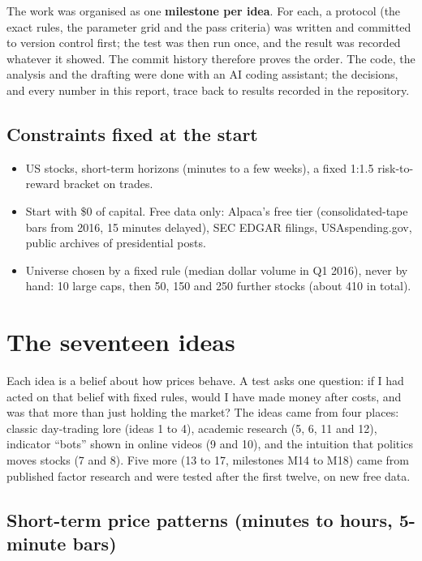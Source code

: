 \documentclass[11pt,a4paper]{article}
\providecommand{\tightlist}{\setlength{\itemsep}{0pt}\setlength{\parskip}{0pt}}
\begin{document}
The work was organised as one \textbf{milestone per idea}. For each, a protocol (the exact rules, the parameter grid and the pass
criteria) was written and committed to version control first; the test was then run once, and the result was recorded
whatever it showed. The commit history therefore proves the order. The code, the analysis and the drafting were done with an
AI coding assistant; the decisions, and every number in this report, trace back to results recorded in the repository.

\subsection{Constraints fixed at the start}\label{sec:constraints}

\begin{itemize}
\tightlist
\item
  US stocks, short-term horizons (minutes to a few weeks), a fixed 1:1.5 risk-to-reward bracket on trades.
\item
  Start with \$0 of capital. Free data only: Alpaca's free tier (consolidated-tape bars from 2016, 15 minutes delayed),
  SEC EDGAR filings, USAspending.gov, public archives of presidential posts.
\item
  Universe chosen by a fixed rule (median dollar volume in Q1 2016), never by hand: 10 large caps, then 50, 150 and 250
  further stocks (about 410 in total).
\end{itemize}

\section{The seventeen ideas}\label{sec:ideas}

Each idea is a belief about how prices behave. A test asks one question: if I had acted on that belief with fixed rules, would
I have made money after costs, and was that more than just holding the market? The ideas came from four places: classic
day-trading lore (ideas 1 to 4), academic research (5, 6, 11 and 12), indicator ``bots'' shown in online videos (9 and 10), and
the intuition that politics moves stocks (7 and 8). Five more (13 to 17, milestones M14 to M18) came from published factor research
and were tested after the first twelve, on new free data.

\subsection{Short-term price patterns (minutes to hours, 5-minute bars)}\label{short-term-price-patterns-minutes-to-hours-5-minute-bars}
\end{document}
